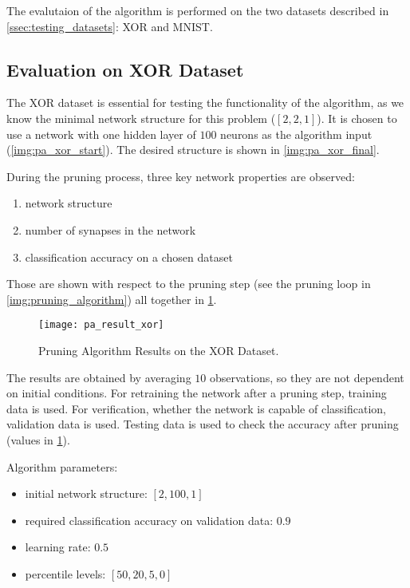 The evalutaion of the algorithm is performed on the two datasets described in \cref{ssec:testing_datasets}: XOR and MNIST.

\subsection{Evaluation on XOR Dataset} \label{ssec:evaluation_on_xor}
The XOR dataset is essential for testing the functionality of the algorithm, as we know the minimal network structure for this problem ($ [2, 2, 1] $). It is chosen to use a network with one hidden layer of $ 100 $ neurons as the algorithm input (\cref{img:pa_xor_start}). The desired structure is shown in \cref{img:pa_xor_final}.

During the pruning process, three key network properties are observed:
\begin{enumerate}
\item network structure
\item number of synapses in the network
\item classification accuracy on a chosen dataset
\end{enumerate}

Those are shown with respect to the pruning step (see the pruning loop in \cref{img:pruning_algorithm}) all together in \cref{fig:pa_result_xor}.

\begin{figure}[H]
  \centering
  \texttt{[image: pa\_result\_xor]}
  \caption{Pruning Algorithm Results on the XOR Dataset.}
  \label{fig:pa_result_xor}
\end{figure}

The results are obtained by averaging $ 10 $ observations, so they are not dependent on initial conditions. For retraining the network after a pruning step, training data is used. For verification, whether the network is capable of classification, validation data is used. Testing data is used to check the accuracy after pruning (values in \cref{fig:pa_result_xor}).

Algorithm parameters:
\begin{itemize}
\item initial network structure: $ [2, 100, 1] $
\item required classification accuracy on validation data: $ 0.9 $
\item learning rate: $ 0.5 $
\item percentile levels: $ [50, 20, 5, 0] $
\end{itemize}

